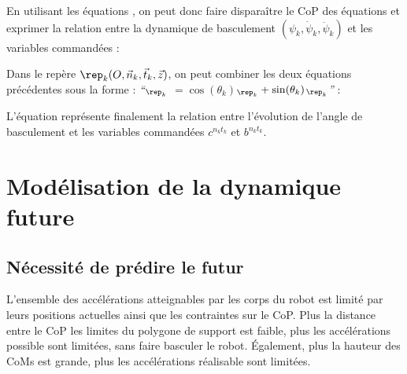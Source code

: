 				En utilisant les équations  , on peut donc faire disparaître le CoP des équations  et exprimer la relation entre la dynamique de basculement $(\psi_k, \dot{\psi}_k, \ddot{\psi}_k)$ et les variables commandées :
				
				Dans le repère $\rep_k(O, \vec{n}_k, \vec{t}_k, \vec{z})$, on peut combiner les deux équations précédentes  sous la forme :
				\textit{``$_{\rep_k}$ $=\cos(\theta_k)$$_{\rep_k}+\sin(\theta_k)$$_{\rep_k}$''} : 
				
				L'équation  représente finalement la relation entre l'évolution de l'angle de basculement et les variables commandées  $c^{n_kt_k}$ et $b^{n_kt_k}$.

	\section{Modélisation de la dynamique future}
		\label{section.modele_futur}
		\subsection{Nécessité de prédire le futur}
	
			L'ensemble des accélérations atteignables par les corps du robot est limité par leurs positions actuelles ainsi que les contraintes sur le CoP. 
			Plus la distance entre le CoP les limites du polygone de support est faible, plus les accélérations possible sont limitées, sans faire basculer le robot.
			Également, plus la hauteur des CoMs est grande, plus les accélérations réalisable sont limitées.
			
